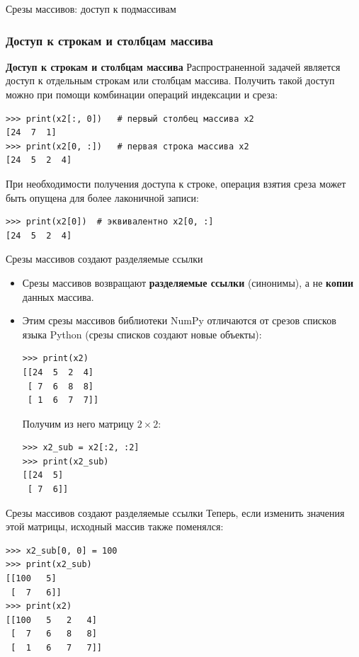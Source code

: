 \documentclass[aspectratio=169, mathserif]{beamer}	%
\begin{document}
\begin{frame}[fragile]{Срезы массивов: доступ к подмассивам}
\scriptsize
\subsubsection{Доступ к строкам и столбцам массива}
\begin{alertblock}{\textbf{Доступ к строкам и столбцам массива}}
Распространенной задачей является доступ к отдельным строкам или столбцам массива.
Получить такой доступ можно при помощи комбинации операций индексации и среза:
\begin{verbatim}
>>> print(x2[:, 0])   # первый столбец массива x2
[24  7  1]
>>> print(x2[0, :])   # первая строка массива x2
[24  5  2  4]
\end{verbatim}
При необходимости получения доступа к строке, операция взятия среза может быть опущена для более лаконичной записи:
\begin{verbatim}
>>> print(x2[0])  # эквивалентно x2[0, :]
[24  5  2  4]
\end{verbatim}
\end{alertblock}
\vfill
\end{frame}

\begin{frame}[fragile]{Срезы массивов создают разделяемые ссылки}
\scriptsize
\begin{itemize}
\item Срезы массивов возвращают \textcolor{extraorange}{\textbf{разделяемые ссылки}} (синонимы), а не \textcolor{extraorange}{\textbf{копии}} данных массива. 
\item Этим срезы массивов библиотеки NumPy отличаются от срезов списков языка Python (срезы списков создают новые объекты):
\begin{verbatim}
>>> print(x2)
[[24  5  2  4]
 [ 7  6  8  8]
 [ 1  6  7  7]]
\end{verbatim}

Получим из него матрицу $2 \times 2$:

\begin{verbatim}
>>> x2_sub = x2[:2, :2]
>>> print(x2_sub)
[[24  5]
 [ 7  6]]
\end{verbatim}
\end{itemize}
\vfill
\end{frame}

\begin{frame}[fragile]{Срезы массивов создают разделяемые ссылки}
\scriptsize
Теперь, если изменить значения этой матрицы, исходный массив также поменялся:

\begin{verbatim}
>>> x2_sub[0, 0] = 100
>>> print(x2_sub)
[[100   5]
 [  7   6]]
>>> print(x2)
[[100   5   2   4]
 [  7   6   8   8]
 [  1   6   7   7]]
\end{verbatim}
\vfill
\end{frame}
\end{document}
